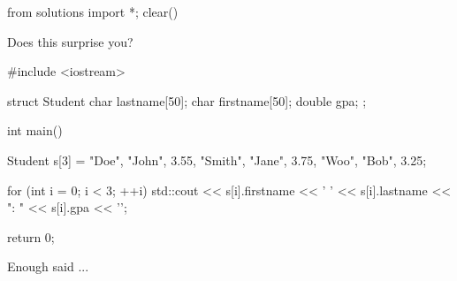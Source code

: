 \begin{python0}
from solutions import *; clear()
\end{python0}

Does this surprise you?

\begin{consolethree}[escapeinside=||]
#include <iostream>

struct Student
{
    char lastname[50];
    char firstname[50];
    double gpa;
};

int main()
{
    Student s[3] = {{"Doe", "John", 3.55},
                    {"Smith", "Jane", 3.75},
                    {"Woo", "Bob", 3.25}};

    for (int i = 0; i < 3; ++i)
    {
        std::cout << s[i].firstname << ' '
                  << s[i].lastname << ": "
                  << s[i].gpa << '\n';
    }

    return 0;
}
\end{consolethree}

Enough said ...


